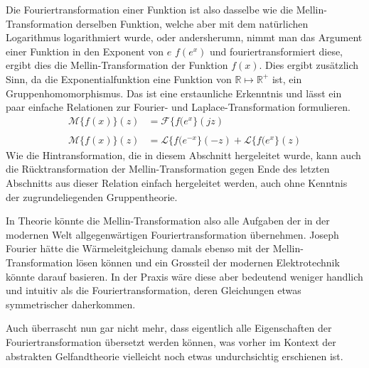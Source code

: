 Die Fouriertransformation einer Funktion ist also dasselbe wie die Mellin-Transformation derselben Funktion, welche aber
mit dem natürlichen Logarithmus logarithmiert wurde, oder andersherumn, nimmt man das Argument einer Funktion 
in den Exponent von $e$ $f(e^x)$ und fouriertransformiert diese, ergibt dies die Mellin-Transformation der Funktion $f(x)$.
Dies ergibt zusätzlich Sinn, da die Exponentialfunktion eine Funktion von $\mathbb{R} \mapsto \mathbb{R^+}$ ist, ein 
Gruppenhomomorphismus.
Das ist eine erstaunliche Erkenntnis und lässt ein paar einfache Relationen zur Fourier- und Laplace-Transformation 
formulieren.
\begin{align*}
    \mathcal{M}\{f(x)\}(z) &= \mathcal{F}\{f (e^{x}\}(jz) \\ \\
    \mathcal{M}\{f(x)\}(z) &= \mathcal{L}\{f (e^{-x}\}(-z) + \mathcal{L}\{f (e^{x}\}(z) 
\end{align*}
Wie die Hintransformation, die in diesem Abschnitt hergeleitet wurde, kann auch die Rücktransformation der Mellin-Transformation gegen 
Ende des letzten Abschnitts aus dieser Relation einfach hergeleitet werden, auch ohne Kenntnis der zugrundeliegenden Gruppentheorie.

In Theorie könnte die Mellin-Transformation also alle Aufgaben der in der modernen Welt allgegenwärtigen Fouriertransformation 
übernehmen. 
Joseph Fourier hätte die Wärmeleitgleichung damals ebenso mit der Mellin-Transformation lösen können und ein Grossteil der modernen 
Elektrotechnik könnte darauf basieren. 
In der Praxis wäre diese aber bedeutend weniger handlich und intuitiv als die Fouriertransformation, deren Gleichungen etwas symmetrischer
daherkommen. %

Auch überrascht nun gar nicht mehr, dass eigentlich alle Eigenschaften der Fouriertransformation übersetzt werden können, 
was vorher im Kontext der abstrakten Gelfandtheorie vielleicht noch etwas undurchsichtig erschienen ist.
